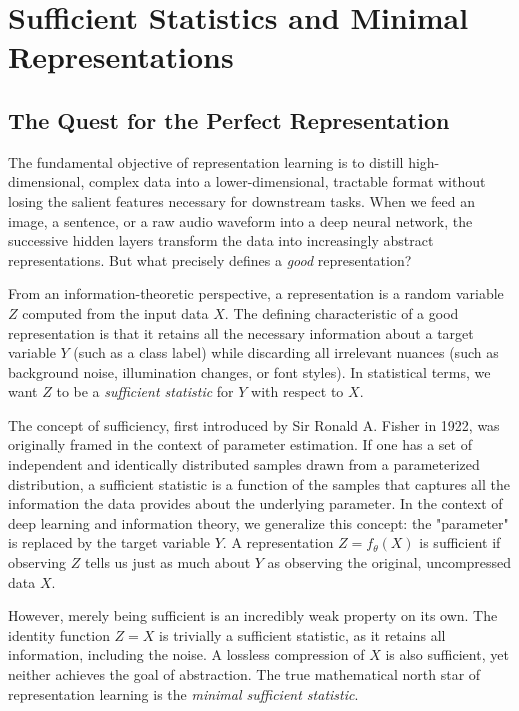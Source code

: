 \chapter{Sufficient Statistics and Minimal Representations}
\label{ch:sufficient_stats}

\section{The Quest for the Perfect Representation}

The fundamental objective of representation learning is to distill high-dimensional, complex data into a lower-dimensional, tractable format without losing the salient features necessary for downstream tasks. When we feed an image, a sentence, or a raw audio waveform into a deep neural network, the successive hidden layers transform the data into increasingly abstract representations. But what precisely defines a \emph{good} representation?

From an information-theoretic perspective, a representation is a random variable $Z$ computed from the input data $X$. The defining characteristic of a good representation is that it retains all the necessary information about a target variable $Y$ (such as a class label) while discarding all irrelevant nuances (such as background noise, illumination changes, or font styles). In statistical terms, we want $Z$ to be a \emph{sufficient statistic} for $Y$ with respect to $X$. 

The concept of sufficiency, first introduced by Sir Ronald A. Fisher in 1922, was originally framed in the context of parameter estimation. If one has a set of independent and identically distributed samples drawn from a parameterized distribution, a sufficient statistic is a function of the samples that captures all the information the data provides about the underlying parameter. In the context of deep learning and information theory, we generalize this concept: the "parameter" is replaced by the target variable $Y$. A representation $Z = f_\theta(X)$ is sufficient if observing $Z$ tells us just as much about $Y$ as observing the original, uncompressed data $X$.

However, merely being sufficient is an incredibly weak property on its own. The identity function $Z = X$ is trivially a sufficient statistic, as it retains all information, including the noise. A lossless compression of $X$ is also sufficient, yet neither achieves the goal of abstraction. The true mathematical north star of representation learning is the \emph{minimal sufficient statistic}. 

